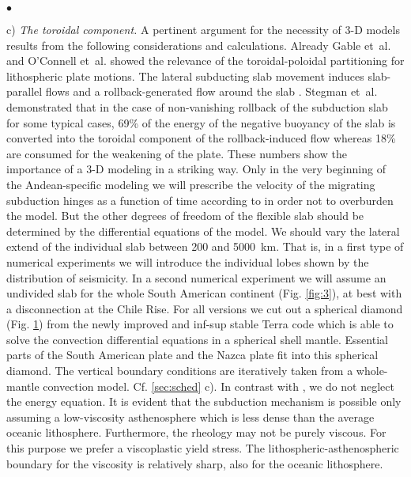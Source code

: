\documentclass[twoside,10pt]{article}
\newenvironment{dlist}
   {\begin{list}
      {$\bullet$}
      {
      \setlength{\topsep}{0.5ex}
      \setlength{\partopsep}{0.0ex}
      \setlength{\parsep}{0.5ex}
      \setlength{\itemsep}{0.0ex}
      \setlength{\itemindent}{3.0ex}
      \setlength{\leftmargin}{0.0ex}
      \setlength{\labelsep}{1.0ex}
      }
   }
   {\end{list}}
\begin{document}
\begin{dlist}
\begin{figure}[htb!]
\begin{minipage}[b]{0.33\textwidth}
  \label{fig:4}
\end{minipage} 
\end{figure}
c) \emph{The toroidal component.}
A pertinent argument for the necessity of 3-D models results from the following considerations and calculations. Already Gable et~al. \cite{Gable1991} and O'Connell et~al. \cite{OConnell1991} showed the relevance of the toroidal-poloidal partitioning for lithospheric plate motions. 
The lateral subducting slab movement induces slab-parallel flows and a rollback-generated flow around the slab \cite{Schellart2004}. 
Stegman et~al. \cite{Stegman2006} demonstrated that in the case of non-vanishing rollback of the subduction slab for some typical cases, 69\% of the energy of the negative buoyancy of the slab is converted into the toroidal component of the rollback-induced flow whereas 18\% are consumed for the weakening of the plate.
These numbers show the importance of a 3-D modeling in a striking way.
Only in the very beginning of the Andean-specific modeling we will prescribe the velocity of the migrating subduction hinges as a function of time according to \cite{Oncken2006} in order not to overburden the model.
But the other degrees of freedom of the flexible slab should be determined by the differential equations of the model.
We should vary the lateral extend of the individual slab between 200 and 5000~km. 
That is, in a first type of numerical experiments we will introduce the individual lobes shown by the distribution of seismicity.
In a second numerical experiment we will assume an undivided slab for the whole South American continent (Fig. \ref{fig:3}), at best with a disconnection at the Chile Rise.
For all versions we cut out a spherical diamond (Fig. \ref{fig:4}) from the newly improved and inf-sup stable Terra code which is able to solve the convection differential equations in a spherical shell mantle.
Essential parts of the South American plate and the Nazca plate fit into this spherical diamond. 
The vertical boundary conditions are iteratively taken from a whole-mantle convection model. Cf. \ref{sec:sched} c).
In contrast with \cite{Stegman2006}, we do not neglect the energy equation.
It is evident that the subduction mechanism is possible only assuming a low-viscosity asthenosphere \cite{Fischer2010} which is less dense than the average oceanic lithosphere. 
Furthermore, the rheology may not be purely viscous. 
For this purpose we \cite{Walzer2008a} prefer a viscoplastic yield stress.
The lithospheric-asthenospheric boundary for the viscosity is relatively sharp, also for the oceanic lithosphere. 

\end{dlist}
\end{document}
